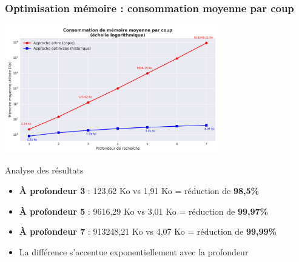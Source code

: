 \documentclass{beamer}
\begin{document}
\begin{frame}
    \frametitle{Optimisation mémoire : consommation moyenne par coup}
    
    \begin{center}
        \includegraphics[width=0.7\textwidth]{../assets/memoire_moyenne.png}
    \end{center}
    
    \begin{block}{Analyse des résultats}
    \scriptsize
    \begin{itemize}
        \item \textbf{À profondeur 3} : 123,62 Ko vs 1,91 Ko = réduction de \textbf{98,5\%}
        \item \textbf{À profondeur 5} : 9616,29 Ko vs 3,01 Ko = réduction de \textbf{99,97\%}
        \item \textbf{À profondeur 7} : 913248,21 Ko vs 4,07 Ko = réduction de \textbf{99,99\%}
        \item La différence s'accentue exponentiellement avec la profondeur
    \end{itemize}
    \end{block}
\end{frame}
\end{document}
